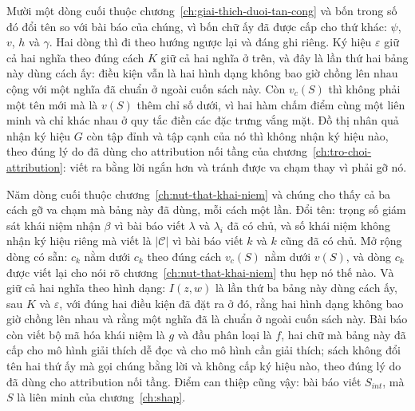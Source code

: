 Mười một dòng cuối thuộc chương~\ref{ch:giai-thich-duoi-tan-cong} và bốn trong
số đó đổi tên so với bài báo của chúng, vì bốn chữ ấy đã được cấp cho thứ khác:
$\psi$, $v$, $h$ và $\gamma$. Hai dòng thì đi theo hướng ngược lại và đáng ghi
riêng. Ký hiệu $\varepsilon$ giữ cả hai nghĩa theo đúng cách $K$ giữ cả hai
nghĩa ở trên, và đây là lần thứ hai bảng này dùng cách ấy: điều kiện vẫn là hai
hình dạng không bao giờ chồng lên nhau cộng với một nghĩa đã chuẩn ở ngoài cuốn
sách này. Còn $v_c(S)$ thì không phải một tên mới mà là $v(S)$ thêm chỉ số dưới,
vì hai hàm chấm điểm cùng một liên minh và chỉ khác nhau ở quy tắc điền các đặc
trưng vắng mặt. Đồ thị nhân quả nhận ký hiệu $G$ còn tập đỉnh và tập cạnh của nó
thì không nhận ký hiệu nào, theo đúng lý do đã dùng cho attribution nối tầng của
chương~\ref{ch:tro-choi-attribution}: viết ra bằng lời ngắn hơn và tránh được va
chạm thay vì phải gỡ nó.

Năm dòng cuối thuộc chương~\ref{ch:nut-that-khai-niem} và chúng cho thấy cả ba
cách gỡ va chạm mà bảng này đã dùng, mỗi cách một lần. Đổi tên: trọng số giám
sát khái niệm nhận $\beta$ vì bài báo viết $\lambda$ và $\lambda_i$ đã có chủ, và
số khái niệm không nhận ký hiệu riêng mà viết là $\lvert\mathcal{C}\rvert$ vì bài
báo viết $k$ và $k$ cũng đã có chủ. Mở rộng dòng có sẵn: $\hat c_k$ nằm dưới
$c_k$ theo đúng cách $v_c(S)$ nằm dưới $v(S)$, và dòng $c_k$ được viết lại cho
nói rõ chương~\ref{ch:nut-that-khai-niem} thu hẹp nó thế nào. Và giữ cả hai
nghĩa theo hình dạng: $I(z,w)$ là lần thứ ba bảng này dùng cách ấy, sau $K$ và
$\varepsilon$, với đúng hai điều kiện đã đặt ra ở đó, rằng hai hình dạng không
bao giờ chồng lên nhau và rằng một nghĩa đã là chuẩn ở ngoài cuốn sách này. Bài
báo còn viết bộ mã hóa khái niệm là $g$ và đầu phân loại là $f$, hai chữ mà bảng
này đã cấp cho mô hình giải thích dễ đọc và cho mô hình cần giải thích; sách
không đổi tên hai thứ ấy mà gọi chúng bằng lời và không cấp ký hiệu nào, theo
đúng lý do đã dùng cho attribution nối tầng. Điểm can thiệp cũng vậy: bài báo
viết $S_{int}$, mà $S$ là liên minh của chương~\ref{ch:shap}.
